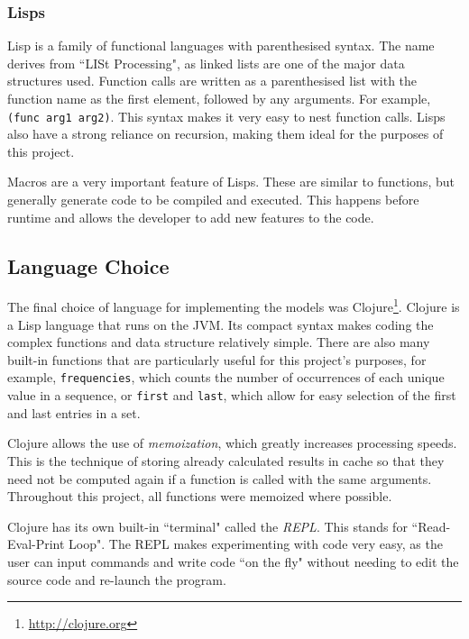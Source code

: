 \subsubsection{Lisps}

Lisp is a family of functional languages with parenthesised syntax. The name derives from ``LISt Processing", as linked lists are one of the major data structures used. Function calls are written as a parenthesised list with the function name as the first element, followed by any arguments. For example, \lstinline!(func arg1 arg2)!. This syntax makes it very easy to nest function calls. Lisps also have a strong reliance on recursion, making them ideal for the purposes of this project. 

Macros are a very important feature of Lisps. These are similar to functions, but generally generate code to be compiled and executed. This happens before runtime and allows the developer to add new features to the code.



\subsection{Language Choice}

The final choice of language for implementing the models was Clojure\footnote{\url{http://clojure.org}}. Clojure is a Lisp language that runs on the JVM. Its compact syntax makes coding the complex functions and data structure relatively simple. There are also many  built-in functions that are particularly useful for this project's purposes, for example, \lstinline!frequencies!, which counts the number of occurrences of each unique value in a sequence, or \lstinline!first! and \lstinline!last!, which allow for easy selection of the first and last entries in a set.

Clojure allows the use of \textit{memoization}, which greatly increases processing speeds. This is the technique of storing already calculated results in cache so that they need not be computed again if a function is called with the same arguments. Throughout this project, all functions were memoized where possible.

Clojure has its own built-in ``terminal" called the \textit{REPL}. This stands for ``Read-Eval-Print Loop". The REPL makes experimenting with code very easy, as the user can input commands and write code ``on the fly" without needing to edit the source code and re-launch the program.



